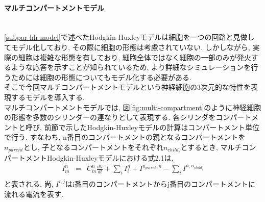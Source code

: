 \paragraph{マルチコンパートメントモデル}~\\
\ref{subpar-hh-model}で述べたHodgkin-Huxleyモデルは細胞を一つの回路と見做してモデル化しており,
その際に細胞の形態は考慮されていない. しかしながら, 実際の細胞は複雑な形態を有しており,
細胞全体ではなく細胞の一部のみが発火するような応答を示すことが知られているため\cite{fujiwara-master},
より詳細なシミュレーションを行うためには細胞の形態についてもモデル化する必要がある.\\
そこで今回マルチコンパートメントモデルという神経細胞の3次元的な特性を表現するモデルを導入する.\\
マルチコンパートメントモデルでは, 図\ref{fig:multi-compartment}のように神経細胞の形態を多数のシリンダーの連なりとして表現する.
各シリンダをコンパートメントと呼び, 前節で示したHodgkin-Huxleyモデルの計算はコンパートメント単位で行う. すなわち,
n番目のコンパートメントの親となるコンパートメントを$n_{parent}$とし, 子となるコンパートメントをそれぞれ$n_{child_{i}}$とするとき,
マルチコンパートメントHodgkin-Huxleyモデルにおける式2.1は,
\begin{eqnarray}
  I_{m}^{n} & = & C_{m}^{n}\frac{dV}{dt} + \sum_{i} I_{i}^{n} + I^{n_{parent}, n} - \sum_{i} I^{n, n_{child_{i}}}\\
\end{eqnarray}
と表される. 尚, $I^{i, j}$はi番目のコンパートメントからj番目のコンパートメントに流れる電流を表す.

